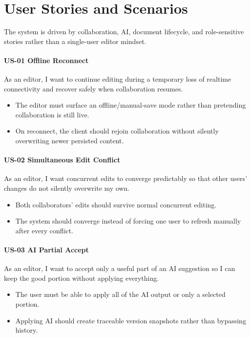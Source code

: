 \section{User Stories and Scenarios}

The system is driven by collaboration, AI, document lifecycle, and role-sensitive stories rather than a
single-user editor mindset.

\paragraph{US-01 Offline Reconnect} As an editor, I want to continue editing during a temporary loss of
realtime connectivity and recover safely when collaboration resumes.
\begin{itemize}
  \item The editor must surface an offline/manual-save mode rather than pretending collaboration is still live.
  \item On reconnect, the client should rejoin collaboration without silently overwriting newer persisted content.
\end{itemize}

\paragraph{US-02 Simultaneous Edit Conflict} As an editor, I want concurrent edits to converge predictably
so that other users' changes do not silently overwrite my own.
\begin{itemize}
  \item Both collaborators' edits should survive normal concurrent editing.
  \item The system should converge instead of forcing one user to refresh manually after every conflict.
\end{itemize}

\paragraph{US-03 AI Partial Accept} As an editor, I want to accept only a useful part of an AI suggestion
so I can keep the good portion without applying everything.
\begin{itemize}
  \item The user must be able to apply all of the AI output or only a selected portion.
  \item Applying AI should create traceable version snapshots rather than bypassing history.
\end{itemize}

